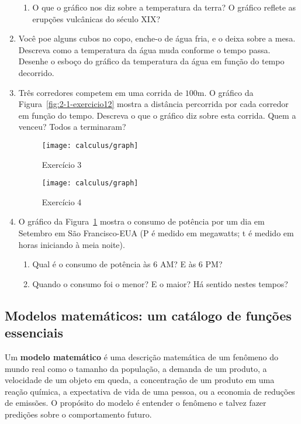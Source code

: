 \begin{enumerate}[label=\textbf{\arabic*.},leftmargin=*]
\begin{enumerate}
    \item O que o gráfico nos diz sobre a temperatura da terra? O gráfico reflete as erupções vulcânicas do século XIX?
  \end{enumerate}
  \item Você poe alguns cubos no copo, enche-o de água fria, e o deixa sobre a mesa. Descreva como a temperatura da água muda conforme o tempo passa. Desenhe o esboço do gráfico da temperatura da água em função do tempo decorrido.
  \item Três corredores competem em uma corrida de $100\si{\meter}$. O gráfico da Figura~\ref{fig:2-1-exercicio12} mostra a distância percorrida por cada corredor em função do tempo. Descreva o que o gráfico diz sobre esta corrida. Quem a venceu? Todos a terminaram?
  \begin{figure}[!ht]
    \centering
    \begin{minipage}{0.49\columnwidth}
      \texttt{[image: calculus/graph]}
      \caption{Exercício 3}
      \label{fig:2-1-exercicio12}
    \end{minipage}
    \begin{minipage}{0.49\columnwidth}
      \texttt{[image: calculus/graph]}
      \caption{Exercício 4}
      \label{fig:2-1-exercicio13}
    \end{minipage}
  \end{figure}
  \item O gráfico da Figura~\ref{fig:2-1-exercicio13} mostra o consumo de potência por um dia em Setembro em São Francisco-EUA (P é medido em megawatts; t é medido em horas iniciando à meia noite).
  \begin{enumerate}
    \item Qual é o consumo de potência às 6 AM? E às 6 PM?
    \item Quando o consumo foi o menor? E o maior? Há sentido nestes tempos?
  \end{enumerate}
\end{enumerate}

\subsection{Modelos matemáticos: um catálogo de funções essenciais}

Um \textbf{modelo matemático} é uma descrição matemática de um fenômeno do mundo real como o tamanho da população, a demanda de um produto, a velocidade de um objeto em queda, a concentração de um produto em uma reação química, a expectativa de vida de uma pessoa, ou a economia de reduções de emissões. O propósito do modelo é entender o fenômeno e talvez fazer predições sobre o comportamento futuro.

